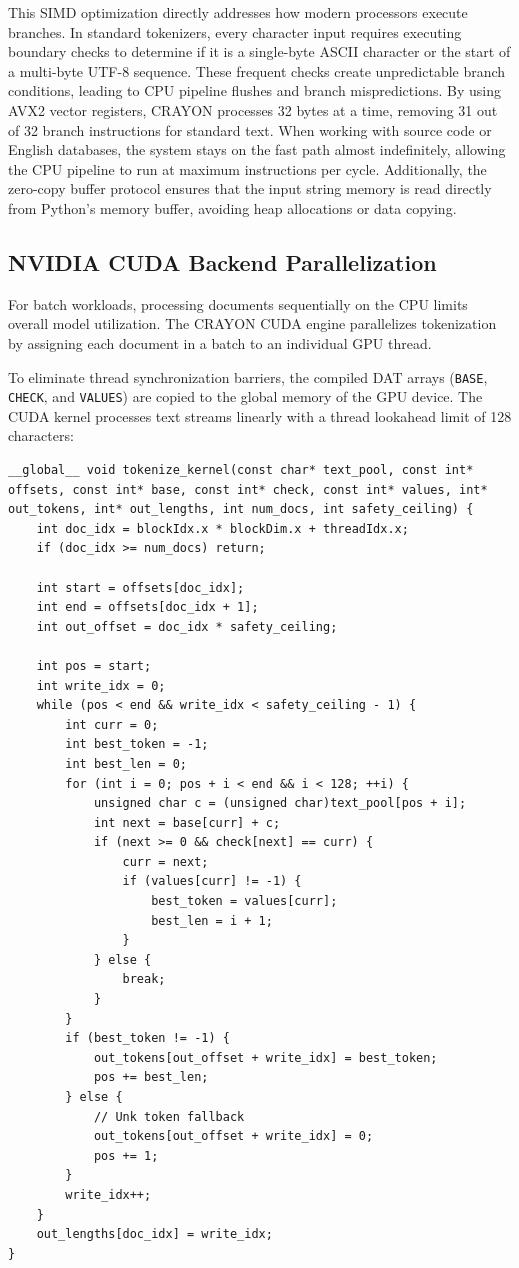 \documentclass[10pt,journal,compsoc]{IEEEtran}
\begin{document}
This SIMD optimization directly addresses how modern processors execute branches. In standard tokenizers, every character input requires executing boundary checks to determine if it is a single-byte ASCII character or the start of a multi-byte UTF-8 sequence. These frequent checks create unpredictable branch conditions, leading to CPU pipeline flushes and branch mispredictions. By using AVX2 vector registers, CRAYON processes 32 bytes at a time, removing 31 out of 32 branch instructions for standard text. When working with source code or English databases, the system stays on the fast path almost indefinitely, allowing the CPU pipeline to run at maximum instructions per cycle. Additionally, the zero-copy buffer protocol ensures that the input string memory is read directly from Python's memory buffer, avoiding heap allocations or data copying.

\subsection{NVIDIA CUDA Backend Parallelization}
For batch workloads, processing documents sequentially on the CPU limits overall model utilization. The CRAYON CUDA engine parallelizes tokenization by assigning each document in a batch to an individual GPU thread.

To eliminate thread synchronization barriers, the compiled DAT arrays (\texttt{BASE}, \texttt{CHECK}, and \texttt{VALUES}) are copied to the global memory of the GPU device. The CUDA kernel processes text streams linearly with a thread lookahead limit of 128 characters:
\begin{lstlisting}[caption={CUDA Ingestion Kernels}]
__global__ void tokenize_kernel(const char* text_pool, const int* offsets, const int* base, const int* check, const int* values, int* out_tokens, int* out_lengths, int num_docs, int safety_ceiling) {
    int doc_idx = blockIdx.x * blockDim.x + threadIdx.x;
    if (doc_idx >= num_docs) return;

    int start = offsets[doc_idx];
    int end = offsets[doc_idx + 1];
    int out_offset = doc_idx * safety_ceiling;

    int pos = start;
    int write_idx = 0;
    while (pos < end && write_idx < safety_ceiling - 1) {
        int curr = 0;
        int best_token = -1;
        int best_len = 0;
        for (int i = 0; pos + i < end && i < 128; ++i) {
            unsigned char c = (unsigned char)text_pool[pos + i];
            int next = base[curr] + c;
            if (next >= 0 && check[next] == curr) {
                curr = next;
                if (values[curr] != -1) {
                    best_token = values[curr];
                    best_len = i + 1;
                }
            } else {
                break;
            }
        }
        if (best_token != -1) {
            out_tokens[out_offset + write_idx] = best_token;
            pos += best_len;
        } else {
            // Unk token fallback
            out_tokens[out_offset + write_idx] = 0;
            pos += 1;
        }
        write_idx++;
    }
    out_lengths[doc_idx] = write_idx;
}
\end{lstlisting}
\end{document}
